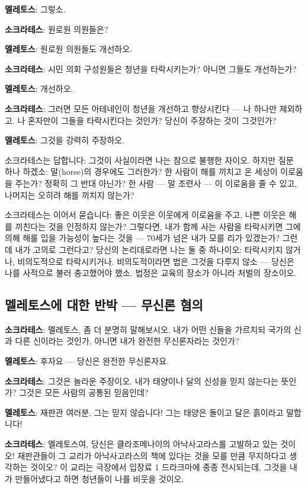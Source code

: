 \documentclass[11pt, a4paper]{article}
\begin{document}
\noindent\textbf{멜레토스}: 그렇소.


\noindent\textbf{소크라테스}: 원로원 의원들은?


\noindent\textbf{멜레토스}: 원로원 의원들도 개선하오.


\noindent\textbf{소크라테스}: 시민 의회 구성원들은 청년을 타락시키는가? 아니면 그들도 개선하는가?


\noindent\textbf{멜레토스}: 개선하오.


\noindent\textbf{소크라테스}: 그러면 모든 아테네인이 청년을 개선하고 향상시킨다 — 나 하나만 제외하고. 나 혼자만이 그들을 타락시킨다는 것인가? 당신이 주장하는 것이 그것인가?


\noindent\textbf{멜레토스}: 그것을 강력히 주장하오.


소크라테스는 답합니다: 그것이 사실이라면 나는 참으로 불행한 자이오. 하지만 질문 하나 하겠소: 말(horse)의 경우에도 그러한가? 한 사람이 해를 끼치고 온 세상이 이로움을 주는가? 정확히 그 반대 아닌가? 한 사람 — 말 조련사 — 이 이로움을 줄 수 있고, 나머지는 오히려 해를 끼치지 않는가?


소크라테스는 이어서 묻습니다: 좋은 이웃은 이웃에게 이로움을 주고, 나쁜 이웃은 해를 끼친다는 것을 인정하지 않는가? 그렇다면, 내가 함께 사는 사람을 타락시키면 그에 의해 해를 입을 가능성이 높다는 것을 — 70세가 넘은 내가 모를 리가 있겠는가? 그런데 내가 고의로 그런다고? 당신의 논리대로라면 나는 둘 중 하나이오: 타락시키지 않거나, 비의도적으로 타락시키거나. 비의도적이라면 법은 그것을 다루지 않소 — 당신은 나를 사적으로 불러 충고했어야 했소. 법정은 교육의 장소가 아니라 처벌의 장소이오.


\bigskip


\subsection{멜레토스에 대한 반박 — 무신론 혐의}


\noindent\textbf{소크라테스}: 멜레토스, 좀 더 분명히 말해보시오. 내가 어떤 신들을 가르치되 국가의 신과 다른 신이라는 것인가, 아니면 내가 완전한 무신론자라는 것인가?


\noindent\textbf{멜레토스}: 후자요 — 당신은 완전한 무신론자요.


\noindent\textbf{소크라테스}: 그것은 놀라운 주장이오. 내가 태양이나 달의 신성을 믿지 않는다는 뜻인가? 그것은 모든 사람의 공통된 믿음인데?


\noindent\textbf{멜레토스}: 재판관 여러분, 그는 믿지 않습니다! 그는 태양은 돌이고 달은 흙이라고 말합니다!


\noindent\textbf{소크라테스}: 멜레토스여, 당신은 클라조메나이의 아낙사고라스를 고발하고 있는 것이오! 재판관들이 그 교리가 아낙사고라스의 책에 있다는 것을 모를 만큼 무지하다고 생각하는 것이오? 이 교리는 극장에서 입장료 1 드라크마에 종종 전시되는데, 그것을 내가 만들어냈다고 하면 청년들이 나를 비웃을 것이오.
\end{document}

